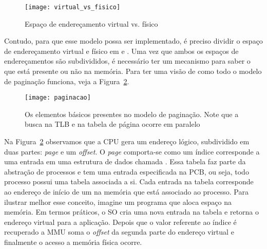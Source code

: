 \begin{figure}[!h]
  \centering
  \texttt{[image: virtual\_vs\_fisico]} 
  \caption{Espaço de endereçamento virtual vs. físico}
  \label{fig:vas_pas}
\end{figure}

 Contudo, para que esse modelo possa ser implementado, é
preciso dividir o espaço de endereçamento virtual e físico em
 e . Uma vez que ambos os espaços de
endereçamentos são subdivididos, é necessário ter um mecanismo para saber o que
está presente ou não na memória. Para ter uma visão de como todo o modelo de
paginação funciona, veja a Figura~\ref{fig:paginacao}.

\begin{figure}[!h]
  \centering
  \texttt{[image: paginacao]} 
	\caption[Os elementos básicos presentes no modelo de paginação.]{Os elementos básicos presentes no modelo de paginação. Note que a busca na TLB e na tabela de página ocorre em paralelo}
  \label{fig:paginacao}
\end{figure}

Na Figura~\ref{fig:paginacao} observamos que a CPU gera um endereço lógico,
subdividido em duas partes: \textit{page} e um \textit{offset}. O \emph{page}
comporta-se como um índice corresponde a uma entrada em uma estrutura de dados
chamada . Essa tabela faz parte da abstração
de processos e tem uma entrada especificada na PCB, ou seja, todo processo
possui uma tabela associada a si. Cada entrada na tabela corresponde ao
endereço de início de um  na memória que está associado ao
processo.  Para ilustrar melhor esse conceito, imagine um programa que aloca
espaço na memória. Em termos práticos, o SO cria uma nova entrada na tabela e
retorna o endereço virtual para a aplicação.  Depois que o valor referente ao
índice é recuperado a MMU soma o \textit{offset} da segunda parte do endereço
virtual e finalmente o acesso a memória física ocorre.

